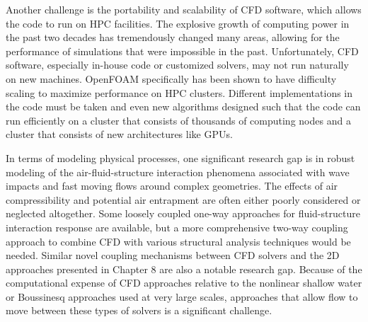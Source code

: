 Another challenge is the portability and scalability of CFD software, which allows the code to run on HPC facilities. The explosive growth of computing power in the past two decades has tremendously changed many areas, allowing for the performance of simulations that were impossible in the past. Unfortunately, CFD software, especially in-house code or customized solvers, may not run naturally on new machines.  OpenFOAM specifically has been shown to have difficulty scaling to maximize performance on HPC clusters. Different implementations in the code must be taken and even new algorithms designed such that the code can run efficiently on a cluster that consists of thousands of computing nodes and a cluster that consists of new architectures like GPUs.

In terms of modeling physical processes, one significant research gap is in robust modeling of the air-fluid-structure interaction phenomena associated with wave impacts and fast moving flows around complex geometries.  The effects of air compressibility and potential air entrapment are often either poorly considered or neglected altogether.  Some loosely coupled one-way approaches for fluid-structure interaction response are available, but a more comprehensive two-way coupling approach to combine CFD with various structural analysis techniques would be needed.  Similar novel coupling mechanisms between CFD solvers and the 2D approaches presented in Chapter 8 are also a notable research gap.  Because of the computational expense of CFD approaches relative to the nonlinear shallow water or Boussinesq approaches used at very large scales, approaches that allow flow to move between these types of solvers is a significant challenge.
